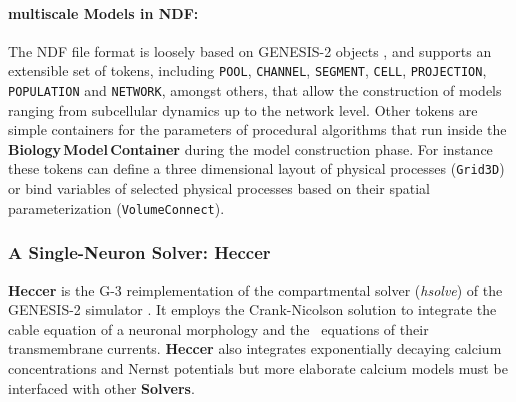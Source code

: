 \documentclass[11pt,3p,twocolumn]{JMN}
\begin{document}


\paragraph{multiscale Models in NDF:} The NDF file format is loosely based on GENESIS-2 objects \cite{bower98:_book_genes}, and supports an extensible set of tokens, including {\tt POOL}, {\tt CHANNEL}, {\tt SEGMENT}, {\tt CELL}, {\tt PROJECTION}, {\tt POPULATION} and {\tt NETWORK}, amongst others, that allow the construction of models ranging from subcellular dynamics up to the network level.  Other tokens are simple containers for the parameters of procedural algorithms that run inside the {\bf Biology\,Model\,Container} during the model construction phase.  For instance these tokens can define a three dimensional layout of physical processes ({\tt Grid3D}) or bind variables of selected physical processes based on their spatial parameterization ({\tt VolumeConnect}).

\subsubsection{A Single-Neuron Solver: Heccer}

{\bf Heccer} is the G-3 reimplementation of the compartmental solver ({\it hsolve}) of the GENESIS-2 simulator \cite{cornelis02:_tutor}.  It employs the Crank-Nicolson solution to integrate the cable equation of a neuronal morphology and the~\citet{hodgkin52e} equations of their transmembrane currents. {\bf Heccer} also integrates exponentially decaying calcium concentrations and Nernst potentials but  more elaborate calcium models must be interfaced with other {\bf Solvers}.

\end{document}

